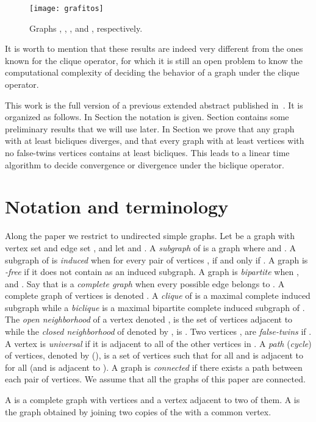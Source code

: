 \documentclass[12pt]{article}
\begin{document}
\begin{figure}[ht!]
	\centering
	\texttt{[image: grafitos]}
	\caption{Graphs , , ,  and , respectively.}
	\label{grafitos}
\end{figure}

It is worth to mention that these results are indeed very different from the ones known for the clique operator, for which it is still an open problem to know the computational complexity of deciding the behavior of a graph under the clique operator. 

This work is the full version of a previous extended abstract  published in~\cite{marinayoENDM}. It is organized as follows. In Section  the notation is given. Section  contains some preliminary results that we will use later. In Section  we prove that any graph with at least  bicliques diverges, and that every graph with at least  vertices with no false-twins vertices  contains at least  bicliques. This leads to a linear time algorithm to decide convergence or divergence under the biclique operator.

\section{Notation and terminology}

Along the paper we restrict to undirected simple graphs. Let  be a graph with vertex set  and edge set , and 
let  and . A \emph{subgraph}  of  is a graph  where  and 
. A subgraph  of  is \emph{induced} when for every pair of vertices ,  
if and only if . A graph  is \emph{-free} if it does not contain  as an induced subgraph.
A graph  is \emph{bipartite} when ,  and . Say that  is a 
\emph{complete graph} when every possible edge belongs to . A complete graph of  vertices is denoted . A \emph{clique} of  is a maximal complete induced subgraph while a \emph{biclique} is a maximal bipartite complete induced subgraph of . The \emph{open neighborhood} of a 
vertex  denoted , is the set of vertices adjacent to  while the \emph{closed neighborhood} of  denoted by 
, is . Two vertices ,  are \emph{false-twins} if . A vertex  is \emph{universal} if it is 
adjacent to all of the other vertices in . A \emph{path} (\emph{cycle}) of  vertices, denoted by  (), is a set of vertices 
 such that  for all  and  is adjacent to  
for all  (and  is adjacent to ). A graph is \emph{connected} if there exists a path between each pair of vertices. 
We assume that all the graphs of this paper are connected.

A  is a complete graph with  vertices and a vertex adjacent to two of them. 
A  is the graph obtained by joining two copies of the  with a common vertex.
\end{document}

